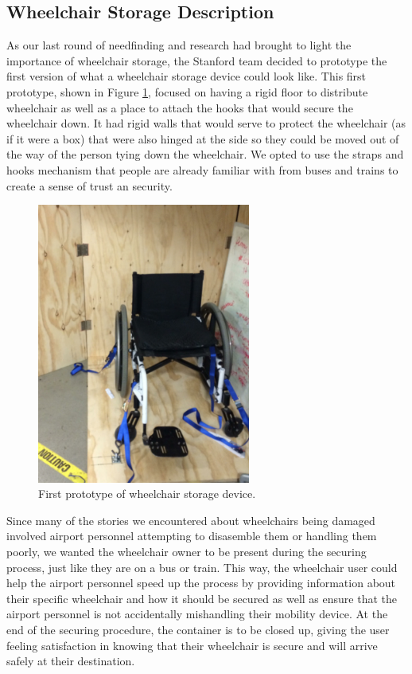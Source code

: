 \subsection{Wheelchair Storage Description}

As our last round of needfinding and research had brought to light the importance of wheelchair storage, the Stanford team decided to prototype the first version of what a wheelchair storage device could look like. This first prototype, shown in 
Figure \ref{fig:wheelchairprototype1.png}, focused on having a rigid floor to distribute wheelchair as well as a place to attach the hooks that would secure the wheelchair down. It had rigid walls that would serve to protect the wheelchair (as if it were a box) that were also hinged at the side so they could be moved out of the way of the person tying down the wheelchair. We opted to use the straps and hooks mechanism that people are already familiar with from buses and trains to create a sense of trust an security. 

\begin{figure}[h]
  \centering
     \includegraphics[width=7cm]{images/wheelchairprototype1.png}
   \caption{First prototype of wheelchair storage device.}
  \label{fig:wheelchairprototype1.png}
\end{figure}

Since many of the stories we encountered about wheelchairs being damaged involved airport personnel attempting to disasemble them or handling them poorly, we wanted the wheelchair owner to be present during the securing process, just like they are on a bus or train. This way, the wheelchair user could help the airport personnel speed up the process by providing information about their specific wheelchair and how it should be secured as well as ensure that the airport personnel is not accidentally mishandling their mobility device. At the end of the securing procedure, the container is to be closed up, giving the user feeling satisfaction in knowing that their wheelchair is secure and will arrive safely at their destination. 
 
